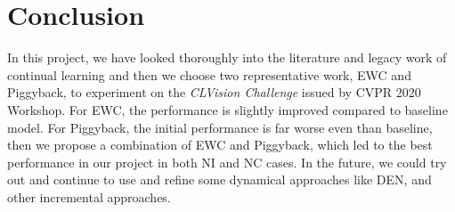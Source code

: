 \section{Conclusion}\label{conclusion}
In this project, we have looked thoroughly into the literature and legacy work of continual learning and then we choose two representative work, EWC and Piggyback, to experiment on the \textit{CLVision Challenge} issued by CVPR 2020 Workshop. For EWC, the performance is slightly improved compared to baseline model. For Piggyback, the initial performance is far worse even than baseline, then we propose a combination of EWC and Piggyback, which led to the best performance in our project in both NI and NC cases. In the future, we could try out and continue to use and refine some dynamical approaches like DEN, and other incremental approaches\cite{zhou2012online}. 